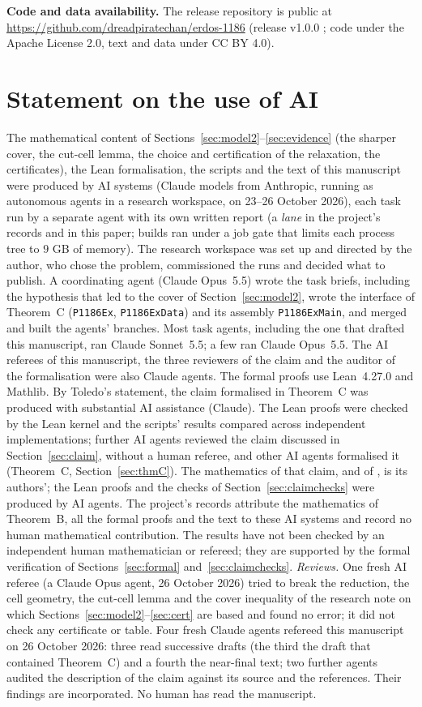 \documentclass[11pt]{amsart}
\theoremstyle{remark}
\begin{document}
\textbf{Code and data availability.} The release repository is public at \url{https://github.com/dreadpiratechan/erdos-1186} (release v1.0.0 \cite{Artifact}; code under the Apache License 2.0, text and data under CC BY 4.0).

\section{Statement on the use of AI}\label{app:ai}
The mathematical content of Sections~\ref{sec:model2}--\ref{sec:evidence} (the sharper cover, the cut-cell lemma, the choice and certification of the relaxation, the certificates), the Lean formalisation, the scripts and the text of this manuscript were produced by AI systems (Claude models from Anthropic, running as
autonomous agents in a research workspace, on 23--26 October 2026), each task run by a separate agent with its own written report (a \emph{lane} in the project's records and in this paper; builds ran under a job gate that limits each process tree to $9$ GB of memory). The research workspace was set up and directed by the author, who chose the problem, commissioned the runs and decided what to publish.
A coordinating agent (Claude Opus~5.5) wrote the task briefs, including the hypothesis that led to the cover of Section~\ref{sec:model2}, wrote the interface of Theorem~C (\texttt{P1186Ex}, \texttt{P1186ExData}) and its assembly \texttt{P1186ExMain}, and merged and built the agents' branches. Most task agents, including the one that drafted this manuscript, ran Claude Sonnet~5.5; a few ran Claude Opus~5.5. The AI referees of this manuscript, the three reviewers of the claim and the auditor of the formalisation were also Claude agents. The formal proofs use Lean~4.27.0 and Mathlib. By Toledo's statement, the claim formalised in Theorem~C was produced with substantial AI assistance (Claude).
The Lean proofs were checked by the Lean kernel and the scripts' results compared across independent implementations; further AI agents reviewed the claim discussed in Section~\ref{sec:claim}, without a human referee, and other AI agents formalised it (Theorem~C, Section~\ref{sec:thmC}). The mathematics of that claim, and of \cite{PRS08}, is its authors'; the Lean proofs and the checks of Section~\ref{sec:claimchecks} were produced by AI agents.
The project's records attribute the mathematics of Theorem~B, all the formal proofs and the text to these AI systems and record no human mathematical contribution. The results have not been checked by an independent human mathematician or refereed; they are supported by the formal verification of Sections~\ref{sec:formal} and~\ref{sec:claimchecks}. \emph{Reviews.} One fresh AI referee (a Claude Opus agent, 26 October 2026) tried to break the reduction, the cell geometry, the cut-cell lemma and the cover inequality of the research note on which Sections~\ref{sec:model2}--\ref{sec:cert} are based and found no error; it did not check any certificate or table. Four fresh Claude agents refereed this manuscript on 26 October 2026: three read successive drafts (the third the draft that contained Theorem~C) and a fourth the near-final text; two further agents audited the description of the claim against its source and the references. Their findings are incorporated. No human has read the manuscript.
\end{document}
